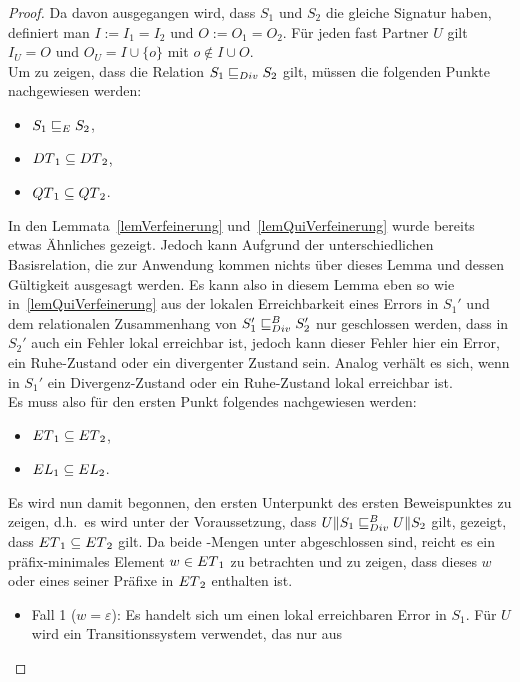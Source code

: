 \begin{proof}
  Da davon ausgegangen wird, dass $S_1$ und $S_2$ die gleiche Signatur haben,
  definiert man $I:=I_1=I_2$ und $O:=O_1=O_2$. Für jeden fast Partner $U$ gilt
  $I_U=O$ und $O_U=I\cup\{o\}$ mit $o\notin I\cup O$.\\
  Um zu zeigen, dass die Relation $S_1\sqsubseteq _{Div} S_2$ gilt, müssen die folgenden
  Punkte nachgewiesen werden:
  \begin{itemize}
    \item $S_1\sqsubseteq _E S_2$,
    \item $DT{}_1\subseteq DT{}_2$,
    \item $QT{}_1\subseteq QT{}_2$.
  \end{itemize}
  In den Lemmata~\ref{lemVerfeinerung} und~\ref{lemQuiVerfeinerung} wurde
  bereits etwas Ähnliches gezeigt. Jedoch kann Aufgrund der unterschiedlichen
  Basisrelation, die zur Anwendung kommen nichts über dieses Lemma und dessen
  Gültigkeit ausgesagt werden. Es kann also in diesem Lemma eben so wie
  in~\ref{lemQuiVerfeinerung} aus der lokalen Erreichbarkeit eines Errors in
  $S_1'$ und dem relationalen Zusammenhang von $S_1'\sqsubseteq _{Div}^B S_2'$ nur
  geschlossen werden, dass in $S_2'$ auch ein Fehler lokal erreichbar ist,
  jedoch kann dieser Fehler hier ein Error, ein Ruhe-Zustand oder ein
  divergenter Zustand sein. Analog verhält es sich, wenn in $S_1'$ ein
  Divergenz-Zustand oder ein Ruhe-Zustand lokal erreichbar ist.\\
  Es muss also für den ersten Punkt folgendes nachgewiesen werden:
  \begin{itemize}
    \item $ET{}_1\subseteq ET{}_2$,
    \item $EL{}_1\subseteq EL{}_2$.
  \end{itemize}
  Es wird nun damit begonnen, den ersten Unterpunkt des ersten Beweispunktes zu
  zeigen, d.h.\ es wird unter der Voraussetzung, dass $U\|S_1\sqsubseteq _{Div}^B U\|S_2$
  gilt, gezeigt, dass $ET{}_1\subseteq ET{}_2$ gilt. Da beide \ET{}-Mengen
  unter \cont{} abgeschlossen sind, reicht es ein präfix-minimales Element
  $w\in ET{}_1$ zu betrachten und zu zeigen, dass dieses $w$ oder eines seiner
  Präfixe in $ET{}_2$ enthalten ist.
  \begin{itemize}
    \item Fall 1 ($w=\varepsilon$): Es handelt sich um einen lokal erreichbaren
      Error in $S_1$. Für $U$ wird ein Transitionssystem verwendet, das nur aus

\end{itemize}
\end{proof}
